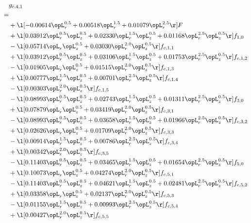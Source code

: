 \begin{alignat}{2} 
\label{eq:g_41_0} 
& g_{c,4,1} \nonumber \\ 
 = \\ 
& + \l[  -0.00614 \opL_r^{0.5} +  0.00518 \opL_r^{1.5} +  0.01079 \opL_r^{2.5}  \r] F \nonumber \\ 
& + \l[  0.03912 \opL_r^{0.5} \opL_z^{0.5} +  0.02330 \opL_r^{1.5} \opL_z^{0.5} +  0.01168 \opL_r^{2.5} \opL_z^{0.5}  \r] f_{1,0} \nonumber \\ 
& - \l[  0.05714 \opL_r \opL_z^{0.5} +  0.03030 \opL_r^{2.0} \opL_z^{0.5}  \r] f_{c,1,1} \nonumber \\ 
& + \l[  0.03912 \opL_r^{0.5} \opL_z^{0.5} +  0.03106 \opL_r^{1.5} \opL_z^{0.5} +  0.01753 \opL_r^{2.5} \opL_z^{0.5}  \r] f_{c,1,2} \nonumber \\ 
& - \l[  0.01905 \opL_r \opL_z^{0.5} +  0.01515 \opL_r^{2.0} \opL_z^{0.5}  \r] f_{c,1,3} \nonumber \\ 
& + \l[  0.00777 \opL_r^{1.5} \opL_z^{0.5} +  0.00701 \opL_r^{2.5} \opL_z^{0.5}  \r] f_{c,1,4} \nonumber \\ 
& - \l[  0.00303 \opL_r^{2.0} \opL_z^{0.5}  \r] f_{c,1,5} \nonumber \\ 
& - \l[  0.08993 \opL_r^{0.5} \opL_z^{0.5} +  0.02743 \opL_r^{1.5} \opL_z^{0.5} +  0.01311 \opL_r^{2.5} \opL_z^{0.5}  \r] f_{3,0} \nonumber \\ 
& + \l[  0.07879 \opL_r \opL_z^{0.5} +  0.03419 \opL_r^{2.0} \opL_z^{0.5}  \r] f_{c,3,1} \nonumber \\ 
& - \l[  0.08993 \opL_r^{0.5} \opL_z^{0.5} +  0.03658 \opL_r^{1.5} \opL_z^{0.5} +  0.01966 \opL_r^{2.5} \opL_z^{0.5}  \r] f_{c,3,2} \nonumber \\ 
& + \l[  0.02626 \opL_r \opL_z^{0.5} +  0.01709 \opL_r^{2.0} \opL_z^{0.5}  \r] f_{c,3,3} \nonumber \\ 
& - \l[  0.00914 \opL_r^{1.5} \opL_z^{0.5} +  0.00786 \opL_r^{2.5} \opL_z^{0.5}  \r] f_{c,3,4} \nonumber \\ 
& + \l[  0.00342 \opL_r^{2.0} \opL_z^{0.5}  \r] f_{c,3,5} \nonumber \\ 
& - \l[  0.11403 \opL_r^{0.5} \opL_z^{0.5} +  0.03465 \opL_r^{1.5} \opL_z^{0.5} +  0.01654 \opL_r^{2.5} \opL_z^{0.5}  \r] f_{5,0} \nonumber \\ 
& + \l[  0.10073 \opL_r \opL_z^{0.5} +  0.04274 \opL_r^{2.0} \opL_z^{0.5}  \r] f_{c,5,1} \nonumber \\ 
& - \l[  0.11403 \opL_r^{0.5} \opL_z^{0.5} +  0.04621 \opL_r^{1.5} \opL_z^{0.5} +  0.02481 \opL_r^{2.5} \opL_z^{0.5}  \r] f_{c,5,2} \nonumber \\ 
& + \l[  0.03358 \opL_r \opL_z^{0.5} +  0.02137 \opL_r^{2.0} \opL_z^{0.5}  \r] f_{c,5,3} \nonumber \\ 
& - \l[  0.01155 \opL_r^{1.5} \opL_z^{0.5} +  0.00993 \opL_r^{2.5} \opL_z^{0.5}  \r] f_{c,5,4} \nonumber \\ 
& + \l[  0.00427 \opL_r^{2.0} \opL_z^{0.5}  \r] f_{c,5,5} \nonumber \\ 
\end{alignat} 


